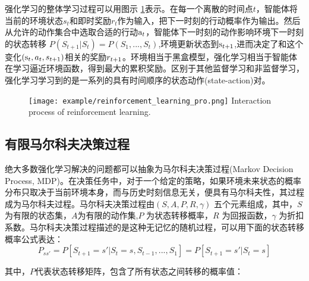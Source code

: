 强化学习的整体学习过程可以用图示 \ref{fig:1}表示。在每一个离散的时间点$t$，智能体将当前的环境状态${s_t}$和即时奖励${r_t}$作为输入，把下一时刻的行动概率作为输出。然后从允许的动作集合中选取合适的行动${{\rm{a}}_t}$，智能体下一时刻的动作影响环境下一时刻的状态转移 $P({S_{t + 1}}|{S_t}) = P({S_1},...,{S_t})$,环境更新状态到${{\rm{s}}_{t + 1}}$,进而决定了和这个变化$\left( {{{\rm{s}}_t},{a_t},{s_{t + 1}}} \right)$相关的奖励${r_{t{\rm{ + }}1}}$。环境相当于黑盒模型，强化学习相当于智能体在学习逼近环境函数，得到最大的累积奖励。区别于其他监督学习和非监督学习，强化学习学习到的是一系列的具有时间顺序的状态动作(state-action)对。

\begin{figure}[htpb]
	\centering
	\texttt{[image: example/reinforcement\_learning\_pro.png]}
	{Interaction process of reinforcement learning.}
	\label{fig:1}
\end{figure}
\subsection{有限马尔科夫决策过程}
绝大多数强化学习解决的问题都可以抽象为马尔科夫决策过程(Markov Decision Process, MDP)。在决策任务中，对于一个给定的策略，如果环境未来状态的概率分布只取决于当前环境本身，而与历史时刻信息无关，便具有马尔科夫性，其过程成为马尔科夫过程。马尔科夫决策过程由$(S,A,P,R,\gamma )$ 五个元素组成，其中，$S$ 为有限的状态集，$ A $为有限的动作集,$P$ 为状态转移概率，$ R $ 为回报函数，$\gamma$ 为折扣系数。马尔科夫决策过程描述的是这种无记忆的随机过程，可以用下面的状态转移概率公式表达：
\begin{equation}
\label{eq:2}
{P_{ss'}} = P[{S_{t + 1}} = s'|{S_t} = s,{S_{t - 1}},...,{S_1}] = P[{S_{t + 1}} = s'|{S_t} = s]
\end{equation}

其中，$ P $代表状态转移矩阵，包含了所有状态之间转移的概率值：

